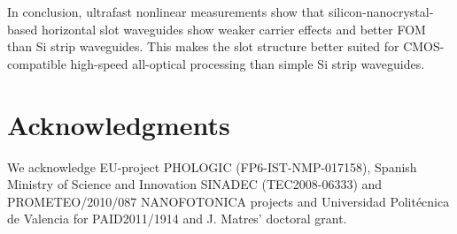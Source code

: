 In conclusion, ultrafast nonlinear measurements show that silicon-nanocrystal-based horizontal slot waveguides show weaker carrier effects and better FOM than Si strip waveguides.
This makes the slot structure better suited for CMOS-compatible high-speed all-optical processing than simple Si strip waveguides.

\section*{Acknowledgments}
We acknowledge EU-project PHOLOGIC (FP6-IST-NMP-017158), Spanish Ministry of Science and Innovation SINADEC (TEC2008-06333) and PROMETEO/2010/087 NANOFOTONICA projects and Universidad Polit\'ecnica de Valencia for PAID2011/1914 and J. Matres' doctoral grant.


%
%

